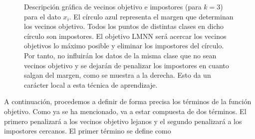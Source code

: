 \begin{figure}[h]
    \centering
    \begin{subfigure}{.5\textwidth}
        \centering
    \end{subfigure}%
    \begin{subfigure}{.5\textwidth}
        \centering
    \end{subfigure}
    \caption{Descripción gráfica de vecinos objetivo e impostores (para $k = 3$) para el dato $x_i$. El círculo azul representa el margen que determinan los vecinos objetivo. Todos los puntos de distintas clases en dicho círculo son impostores. El objetivo LMNN será acercar los vecinos objetivos lo máximo posible y eliminar los impostores del círculo. Por tanto, no influirán los datos de la misma clase que no sean vecinos objetivo y se dejarán de penalizar los impostores en cuanto salgan del margen, como se muestra a la derecha. Esto da un carácter local a esta técnica de aprendizaje.} \label{fig:targets_impostors}
\end{figure}

A continuación, procedemos a definir de forma precisa los términos de la función objetivo. Como ya se ha mencionado, va a estar compuesta de dos términos. El primero penalizará a los vecinos objetivo lejanos y el segundo penalizará a los impostores cercanos. El primer término se define como

